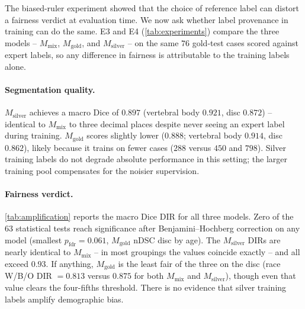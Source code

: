 The biased-ruler experiment showed that the choice of reference label can distort
a fairness verdict at evaluation time. We now ask whether label provenance in
training can do the same. E3 and E4 (\autoref{tab:experiments}) compare
the three models -- $M_{\mathrm{mix}}$, $M_{\mathrm{gold}}$, and
$M_{\mathrm{silver}}$ -- on the same $76$ gold-test cases scored against expert
labels, so any difference in fairness is attributable to the training labels
alone.

\paragraph{Segmentation quality.}
$M_{\mathrm{silver}}$ achieves a macro Dice of $0.897$ (vertebral body $0.921$,
disc $0.872$) -- identical to $M_{\mathrm{mix}}$ to three decimal places despite
never seeing an expert label during training. $M_{\mathrm{gold}}$ scores slightly
lower ($0.888$; vertebral body $0.914$, disc $0.862$), likely because it trains on
fewer cases ($288$ versus $450$ and $798$). Silver training labels do not degrade
absolute performance in this setting; the larger training pool compensates for the
noisier supervision.

\paragraph{Fairness verdict.}
\autoref{tab:amplification} reports the macro Dice DIR for all three models. Zero
of the $63$ statistical tests reach significance after Benjamini--Hochberg
correction on any model (smallest $p_{\mathrm{fdr}} = 0.061$,
$M_{\mathrm{gold}}$ nDSC disc by age). The
$M_{\mathrm{silver}}$ DIRs are nearly identical to $M_{\mathrm{mix}}$ -- in most
groupings the values coincide exactly -- and all exceed $0.93$. If anything,
$M_{\mathrm{gold}}$ is the least fair of the three on the disc (race W/B/O DIR
$= 0.813$ versus $0.875$ for both $M_{\mathrm{mix}}$ and $M_{\mathrm{silver}}$),
though even that value clears the four-fifths threshold. There is no evidence that
silver training labels amplify demographic bias.

